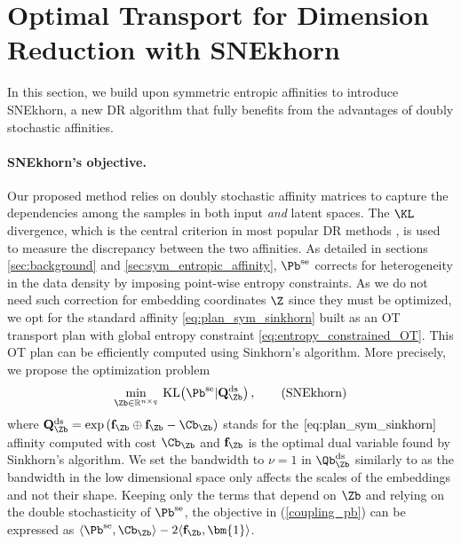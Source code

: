 
\section{Optimal Transport for Dimension Reduction with SNEkhorn}\label{sec:DR_with_OT}

In this section, we build upon symmetric entropic affinities to introduce SNEkhorn, a new DR algorithm that fully benefits from the advantages of doubly stochastic affinities.

\paragraph{SNEkhorn's objective.} Our proposed method relies on doubly stochastic affinity matrices to capture the dependencies among the samples in both input \emph{and} latent spaces. The $\KL$ divergence, which is the central criterion in most popular DR methods \citep{van2022probabilistic}, is used to measure the discrepancy between the two affinities. As detailed in sections \ref{sec:background} and \ref{sec:sym_entropic_affinity}, $\Pb^{\mathrm{se}}$ corrects for heterogeneity in the
data density by imposing point-wise entropy constraints. As we do not need such correction for embedding coordinates $\Z$ since they must be optimized, we opt for the standard affinity \eqref{eq:plan_sym_sinkhorn} built as an OT transport plan with global entropy constraint \eqref{eq:entropy_constrained_OT}. This OT plan can be efficiently computed using Sinkhorn's algorithm. More precisely, 
we propose the optimization problem
\begin{align}\label{coupling_pb}
    \min_{\Zb \in \mathbb{R}^{n \times q}} \:  \mathrm{KL}\big(\Pb^{\mathrm{se}} | \mathbf{Q}^{\mathrm{ds}}_{\Zb} \big)\,,
\tag{SNEkhorn}
\end{align}
where $\mathbf{Q}^{\mathrm{ds}}_{\Zb} = \exp \left(\mathbf{f}_{\Zb} \oplus \mathbf{f}_{\Zb} - \Cb_{\Zb} \right)$ stands for the $\eqref{eq:plan_sym_sinkhorn}$ affinity computed with cost $\Cb_{\Zb}$ and $\mathbf{f}_{\Zb}$ is the optimal dual variable found by Sinkhorn's algorithm.
We set the bandwidth to $\nu = 1$ in $\Qb^{\mathrm{ds}}_{\Zb}$ similarly to \citep{van2008visualizing} as the bandwidth in the low dimensional space only affects the scales of the embeddings and not their shape.
Keeping only the terms that depend on $\Zb$ and relying on the double stochasticity of $\Pb^{\mathrm{se}}$, the objective in (\ref{coupling_pb}) can be expressed as $\langle \Pb^{\mathrm{se}}, \Cb_{\Zb} \rangle - 2 \langle \mathbf{f}_{\Zb}, \bm{1} \rangle$. %

